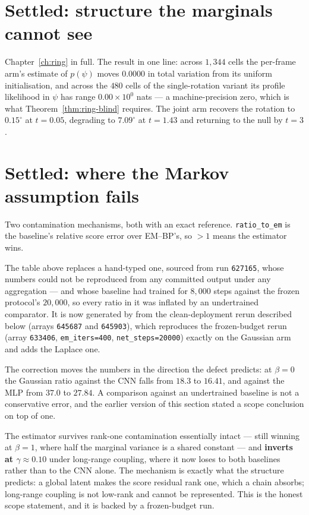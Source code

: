 \section{Settled: structure the marginals cannot see}

Chapter~\ref{ch:ring} in full. The result in one line: across $1{,}344$ cells the per-frame arm's
estimate of $p(\psi)$ moves $0.0000$ in total variation from its uniform initialisation, and
across the $480$ cells of the single-rotation variant its profile likelihood in $\psi$ has range
$0.00\times10^{0}$ nats --- a machine-precision zero, which is what
Theorem~\ref{thm:ring-blind} requires. The joint arm recovers the rotation to $0.15^\circ$ at
$t=0.05$, degrading to $7.09^\circ$ at $t=1.43$ and returning to the null by $t=3$.

\section{Settled: where the Markov assumption fails}
\label{sec:rec-nonmarkov}

Two contamination mechanisms, both with an exact reference. \texttt{ratio\_to\_em} is the
baseline's relative score error over EM--BP's, so $>1$ means the estimator wins.



\begin{pitfall}
The table above replaces a hand-typed one, sourced from run \texttt{627165}, whose numbers could
not be reproduced from any committed output under any aggregation --- and whose baseline had
trained for $8{,}000$ steps against the frozen protocol's $20{,}000$, so every ratio in it was
inflated by an undertrained comparator. It is now generated by
 from the clean-deployment rerun described below
(arrays \texttt{645687} and \texttt{645903}), which reproduces the frozen-budget rerun
(array \texttt{633406}, \texttt{em\_iters=400}, \texttt{net\_steps=20000}) exactly on the
Gaussian arm and adds the Laplace one.

The correction moves the numbers in the direction the defect predicts: at $\beta=0$ the Gaussian
ratio against the CNN falls from $18.3$ to $16.41$, and against the MLP from $37.0$ to $27.84$.
A comparison against an undertrained baseline is not a conservative error, and the earlier
version of this section stated a scope conclusion on top of one.
\end{pitfall}

The estimator survives rank-one contamination essentially intact --- still winning at $\beta=1$,
where half the marginal variance is a shared constant --- and \textbf{inverts at
$\gamma\approx0.10$} under long-range coupling, where it now loses to both baselines rather than
to the CNN alone. The mechanism is exactly what the structure predicts: a global latent makes the
score residual rank one, which a chain absorbs; long-range coupling is not low-rank and cannot be
represented. This is the honest scope statement, and it is backed by a frozen-budget run.

